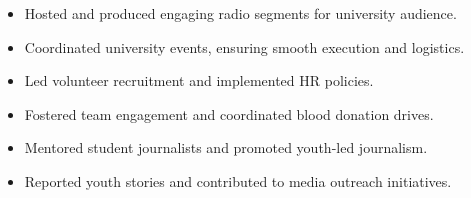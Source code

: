 
\begin{itemize}
    \item Hosted and produced engaging radio segments for university audience.
\end{itemize}

\begin{itemize}
    \item Coordinated university events, ensuring smooth execution and logistics.
\end{itemize}

\begin{itemize}
    \item Led volunteer recruitment and implemented HR policies.
    \item Fostered team engagement and coordinated blood donation drives.
\end{itemize}

\begin{itemize}
    \item Mentored student journalists and promoted youth-led journalism.
    \item Reported youth stories and contributed to media outreach initiatives.
\end{itemize}
